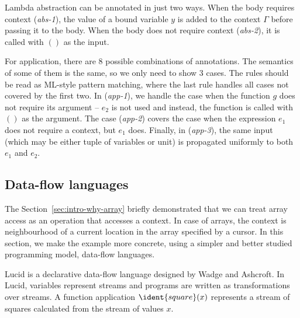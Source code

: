 Lambda abstraction can be annotated in just two ways. When the body requires context (\emph{abs-1}),
the value of a bound variable $y$ is added to the context $\Gamma$ before passing it to the body.
When the body does not require context (\emph{abs-2}), it is called with $()$ as the input.

For application, there are 8 possible combinations of annotations. The semantics of some of them
is the same, so we only need to show 3 cases. The rules should be read as ML-style pattern matching,
where the last rule handles all cases not covered by the first two. In (\emph{app-1}), we handle the
case when the function $g$ does not require its argument -- $e_2$ is not used and instead, the function
is called with $()$ as the argument. The case (\emph{app-2}) covers the case when the expression
$e_1$ does not require a context, but $e_1$ does. Finally, in (\emph{app-3}), the same input
(which may be either tuple of variables or unit) is propagated uniformly to both $e_1$ and $e_2$.


\subsection{Data-flow languages}
The Section~\ref{sec:intro-why-array} briefly demonstrated that we can treat array access as an 
operation that accesses a context. In case of arrays, the context is neighbourhood of a current
location in the array specified by a cursor. In this section, we make the example more concrete,
using a simpler and better studied programming model, data-flow languages.

Lucid \cite{app-lucid} is a declarative data-flow language designed by Wadge and Ashcroft. In Lucid, 
variables represent streams and programs are written as transformations over streams. A function 
application $\ident{square}(x)$ represents a stream of squares calculated from the stream of values $x$.

